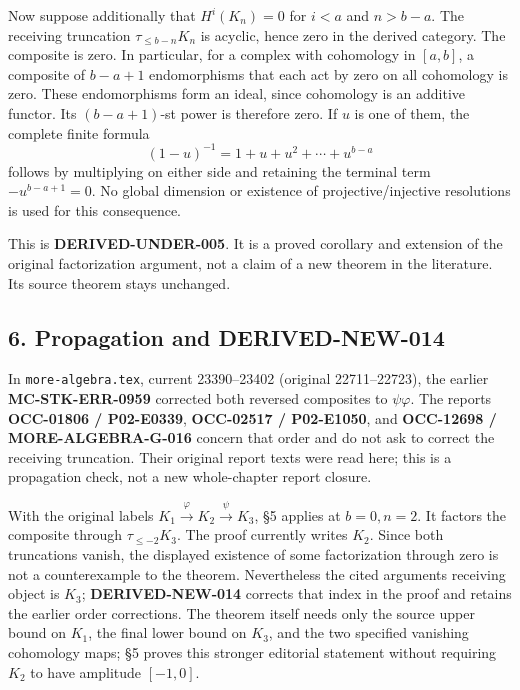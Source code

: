 \documentclass[11pt]{article}
\begin{document}
Now suppose additionally that \(H^i(K_n)=0\) for \(i<a\) and \(n>b-a\). The receiving truncation \(\tau_{\leq b-n}K_n\) is acyclic,\allowbreak{} hence zero in the derived category. The composite is zero. In particular,\allowbreak{} for a complex with cohomology in \([a,b]\),\allowbreak{} a composite of \(b-a+1\) endomorphisms that each act by zero on all cohomology is zero. These endomorphisms form an ideal,\allowbreak{} since cohomology is an additive functor. Its \((b-a+1)\)-st power is therefore zero. If \(u\) is one of them,\allowbreak{} the complete finite formula \[
(1-u)^{-1}=1+u+u^2+\cdots+u^{b-a}
\] follows by multiplying on either side and retaining the terminal term \(-u^{b-a+1}=0\). No global dimension or existence of projective/\allowbreak{}injective resolutions is used for this consequence.

This is \textbf{DERIVED-UNDER-005}. It is a proved corollary and extension of the original factorization argument,\allowbreak{} not a claim of a new theorem in the literature. Its source theorem stays unchanged.

\subsection{6. Propagation and DERIVED-NEW-014}\label{proofs-3487-4161-propagation-and-derived-new-014}

In \texttt{more-\allowbreak{}algebra.\allowbreak{}tex},\allowbreak{} current 23390–\allowbreak{}23402 (original 22711–\allowbreak{}22723)\allowbreak{},\allowbreak{} the earlier \textbf{MC-STK-ERR-0959} corrected both reversed composites to \(\psi\varphi\). The reports \textbf{OCC-01806 /\allowbreak{} P02-E0339},\allowbreak{} \textbf{OCC-02517 /\allowbreak{} P02-E1050},\allowbreak{} and \textbf{OCC-12698 /\allowbreak{} MORE-ALGEBRA-G-016} concern that order and do not ask to correct the receiving truncation. Their original report texts were read here; this is a propagation check,\allowbreak{} not a new whole-chapter report closure.

With the original labels \(K_1\xrightarrow\varphi K_2
\xrightarrow\psi K_3\),\allowbreak{} §5 applies at \(b=0,n=2\). It factors the composite through \textbf{\(\tau_{\leq-2}K_3\)}. The proof currently writes \(K_2\). Since both truncations vanish,\allowbreak{} the displayed existence of some factorization through zero is not a counterexample to the theorem. Nevertheless the cited argument\textquotesingle s receiving object is \(K_3\); \textbf{DERIVED-NEW-014} corrects that index in the proof and retains the earlier order corrections. The theorem itself needs only the source upper bound on \(K_1\),\allowbreak{} the final lower bound on \(K_3\),\allowbreak{} and the two specified vanishing cohomology maps; §5 proves this stronger editorial statement without requiring \(K_2\) to have amplitude \([-1,0]\).
\end{document}
